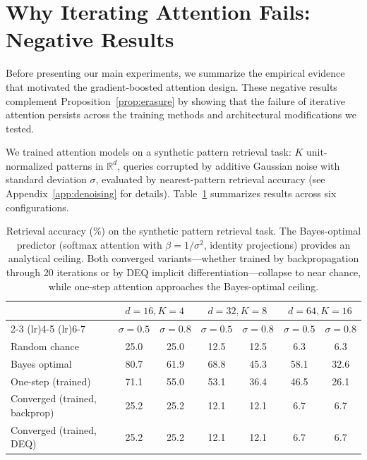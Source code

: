 \documentclass{article}
\theoremstyle{definition}
\begin{document}
\section{Why Iterating Attention Fails: Negative Results}
\label{sec:negative}

Before presenting our main experiments, we summarize the empirical evidence that motivated the gradient-boosted attention design.
These negative results complement Proposition~\ref{prop:erasure} by showing that the failure of iterative attention persists across the training methods and architectural modifications we tested.

We trained attention models on a synthetic pattern retrieval task: $K$ unit-normalized patterns in $\mathbb{R}^d$, queries corrupted by additive Gaussian noise with standard deviation $\sigma$, evaluated by nearest-pattern retrieval accuracy (see Appendix~\ref{app:denoising} for details).
Table~\ref{tab:negative} summarizes results across six configurations.

\begin{table}[t]
\centering
\caption{Retrieval accuracy (\%) on the synthetic pattern retrieval task. The Bayes-optimal predictor (softmax attention with $\beta = 1/\sigma^2$, identity projections) provides an analytical ceiling. Both converged variants---whether trained by backpropagation through 20 iterations or by DEQ implicit differentiation---collapse to near chance, while one-step attention approaches the Bayes-optimal ceiling.}
\label{tab:negative}
\begin{tabular}{@{}lcccccc@{}}
\toprule
& \multicolumn{2}{c}{$d{=}16, K{=}4$} & \multicolumn{2}{c}{$d{=}32, K{=}8$} & \multicolumn{2}{c}{$d{=}64, K{=}16$} \\
\cmidrule(lr){2-3} \cmidrule(lr){4-5} \cmidrule(lr){6-7}
& $\sigma{=}0.5$ & $\sigma{=}0.8$ & $\sigma{=}0.5$ & $\sigma{=}0.8$ & $\sigma{=}0.5$ & $\sigma{=}0.8$ \\
\midrule
Random chance & 25.0 & 25.0 & 12.5 & 12.5 & 6.3 & 6.3 \\
Bayes optimal & 80.7 & 61.9 & 68.8 & 45.3 & 58.1 & 32.6 \\
One-step (trained) & 71.1 & 55.0 & 53.1 & 36.4 & 46.5 & 26.1 \\
Converged (trained, backprop) & 25.2 & 25.2 & 12.1 & 12.1 & 6.7 & 6.7 \\
Converged (trained, DEQ) & 25.2 & 25.2 & 12.1 & 12.1 & 6.7 & 6.7 \\
\bottomrule
\end{tabular}
\end{table}
\end{document}
